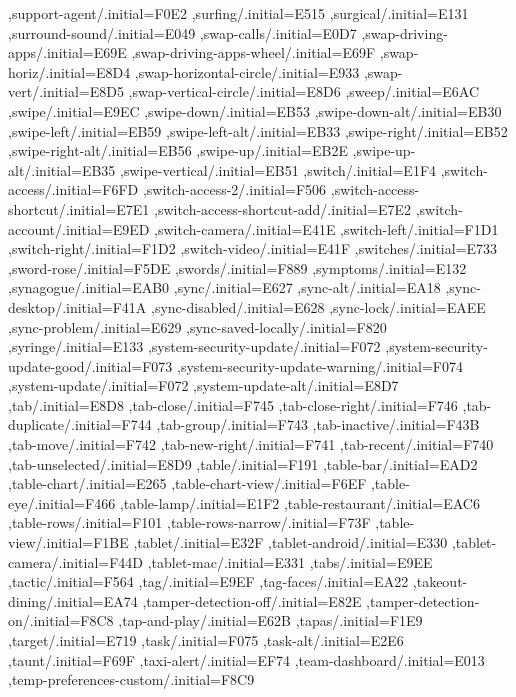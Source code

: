 { ,support-agent/.initial=F0E2
 ,surfing/.initial=E515
 ,surgical/.initial=E131
 ,surround-sound/.initial=E049
 ,swap-calls/.initial=E0D7
 ,swap-driving-apps/.initial=E69E
 ,swap-driving-apps-wheel/.initial=E69F
 ,swap-horiz/.initial=E8D4
 ,swap-horizontal-circle/.initial=E933
 ,swap-vert/.initial=E8D5
 ,swap-vertical-circle/.initial=E8D6
 ,sweep/.initial=E6AC
 ,swipe/.initial=E9EC
 ,swipe-down/.initial=EB53
 ,swipe-down-alt/.initial=EB30
 ,swipe-left/.initial=EB59
 ,swipe-left-alt/.initial=EB33
 ,swipe-right/.initial=EB52
 ,swipe-right-alt/.initial=EB56
 ,swipe-up/.initial=EB2E
 ,swipe-up-alt/.initial=EB35
 ,swipe-vertical/.initial=EB51
 ,switch/.initial=E1F4
 ,switch-access/.initial=F6FD
 ,switch-access-2/.initial=F506
 ,switch-access-shortcut/.initial=E7E1
 ,switch-access-shortcut-add/.initial=E7E2
 ,switch-account/.initial=E9ED
 ,switch-camera/.initial=E41E
 ,switch-left/.initial=F1D1
 ,switch-right/.initial=F1D2
 ,switch-video/.initial=E41F
 ,switches/.initial=E733
 ,sword-rose/.initial=F5DE
 ,swords/.initial=F889
 ,symptoms/.initial=E132
 ,synagogue/.initial=EAB0
 ,sync/.initial=E627
 ,sync-alt/.initial=EA18
 ,sync-desktop/.initial=F41A
 ,sync-disabled/.initial=E628
 ,sync-lock/.initial=EAEE
 ,sync-problem/.initial=E629
 ,sync-saved-locally/.initial=F820
 ,syringe/.initial=E133
 ,system-security-update/.initial=F072
 ,system-security-update-good/.initial=F073
 ,system-security-update-warning/.initial=F074
 ,system-update/.initial=F072
 ,system-update-alt/.initial=E8D7
 ,tab/.initial=E8D8
 ,tab-close/.initial=F745
 ,tab-close-right/.initial=F746
 ,tab-duplicate/.initial=F744
 ,tab-group/.initial=F743
 ,tab-inactive/.initial=F43B
 ,tab-move/.initial=F742
 ,tab-new-right/.initial=F741
 ,tab-recent/.initial=F740
 ,tab-unselected/.initial=E8D9
 ,table/.initial=F191
 ,table-bar/.initial=EAD2
 ,table-chart/.initial=E265
 ,table-chart-view/.initial=F6EF
 ,table-eye/.initial=F466
 ,table-lamp/.initial=E1F2
 ,table-restaurant/.initial=EAC6
 ,table-rows/.initial=F101
 ,table-rows-narrow/.initial=F73F
 ,table-view/.initial=F1BE
 ,tablet/.initial=E32F
 ,tablet-android/.initial=E330
 ,tablet-camera/.initial=F44D
 ,tablet-mac/.initial=E331
 ,tabs/.initial=E9EE
 ,tactic/.initial=F564
 ,tag/.initial=E9EF
 ,tag-faces/.initial=EA22
 ,takeout-dining/.initial=EA74
 ,tamper-detection-off/.initial=E82E
 ,tamper-detection-on/.initial=F8C8
 ,tap-and-play/.initial=E62B
 ,tapas/.initial=F1E9
 ,target/.initial=E719
 ,task/.initial=F075
 ,task-alt/.initial=E2E6
 ,taunt/.initial=F69F
 ,taxi-alert/.initial=EF74
 ,team-dashboard/.initial=E013
 ,temp-preferences-custom/.initial=F8C9
}

